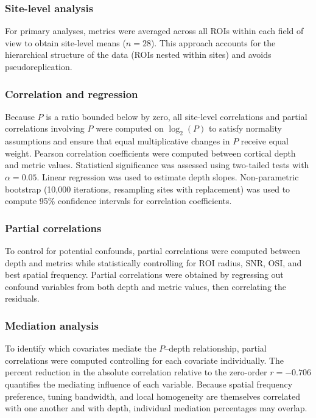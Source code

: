 \documentclass[11pt,letterpaper]{article}
\begin{document}
\subsubsection{Site-level analysis}

For primary analyses, metrics were averaged across all ROIs within each
field of view to obtain site-level means ($n = 28$). This approach accounts
for the hierarchical structure of the data (ROIs nested within sites) and
avoids pseudoreplication.

\subsubsection{Correlation and regression}

Because $P$ is a ratio bounded below by zero, all site-level correlations
and partial correlations involving $P$ were computed on $\log_2(P)$ to
satisfy normality assumptions and ensure that equal multiplicative changes
in $P$ receive equal weight. Pearson correlation coefficients were computed
between cortical depth and metric values. Statistical significance was
assessed using two-tailed tests with $\alpha = 0.05$. Linear regression was
used to estimate depth slopes. Non-parametric bootstrap (10,000 iterations,
resampling sites with replacement) was used to compute 95\% confidence
intervals for correlation coefficients.

\subsubsection{Partial correlations}

To control for potential confounds, partial correlations were computed between
depth and metrics while statistically controlling for ROI radius, SNR,
OSI, and best spatial frequency. Partial correlations were obtained by
regressing out confound variables from both depth and metric values, then
correlating the residuals.

\subsubsection{Mediation analysis}

To identify which covariates mediate the $P$--depth relationship, partial
correlations were computed controlling for each covariate individually. The
percent reduction in the absolute correlation relative to the zero-order
$r = -0.706$ quantifies the mediating influence of each variable. Because
spatial frequency preference, tuning bandwidth, and local homogeneity are
themselves correlated with one another and with depth, individual mediation
percentages may overlap.
\end{document}
